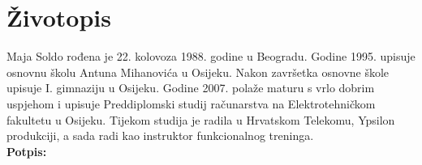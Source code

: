 \newpage
\thispagestyle{empty}

\section*{Životopis} %
\label{sec:Životopis}

Maja Soldo rođena je 22. kolovoza 1988. godine u Beogradu. Godine 1995.
upisuje osnovnu školu Antuna Mihanovića u Osijeku. Nakon završetka
osnovne škole upisuje I. gimnaziju u Osijeku. Godine 2007. polaže maturu
s vrlo dobrim uspjehom i upisuje Preddiplomski studij računarstva na
Elektrotehničkom fakultetu u Osijeku. Tijekom studija je radila u
Hrvatskom Telekomu, Ypsilon produkciji, a sada radi kao instruktor
funkcionalnog treninga.
\\[1cm]

\hfill{\textbf{Potpis:}}
